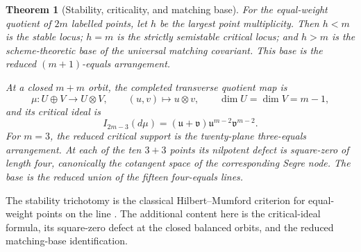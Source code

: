 \documentclass[11pt]{article}
\newtheorem{theorem}{Theorem}[section]
\theoremstyle{definition}
\theoremstyle{remark}
\begin{document}
\begin{theorem}[Stability, criticality, and matching base]
\label{thm:matching-quotient-geometry}
For the equal-weight quotient of \(2m\) labelled points, let \(h\) be the
largest point multiplicity.  Then \(h<m\) is the stable locus; \(h=m\) is
the strictly semistable critical locus; and \(h>m\) is the
scheme-theoretic base of the universal matching covariant.  This base is
the reduced \((m+1)\)-equals arrangement.

At a closed \(m+m\) orbit, the completed transverse quotient map is
\[
 \mu:U\oplus V\longrightarrow U\otimes V,\qquad
 (u,v)\longmapsto u\otimes v,\qquad
 \dim U=\dim V=m-1,
\]
and its critical ideal is
\[
 I_{2m-3}(d\mu)
  =(\mathfrak u+\mathfrak v)
    \mathfrak u^{m-2}\mathfrak v^{m-2}.
\]
For \(m=3\), the reduced critical support is the twenty-plane
three-equals arrangement.  At each of the ten \(3+3\) points its
nilpotent defect is square-zero of length four, canonically the cotangent
space of the corresponding Segre node.  The base is the reduced union of
the fifteen four-equals lines.
\end{theorem}

The stability trichotomy is the classical Hilbert--Mumford criterion for
equal-weight points on the line \cite[Section~1]{HMSV}.  The additional
content here is the critical-ideal formula, its square-zero defect at the
closed balanced orbits, and the reduced matching-base identification.
\end{document}
